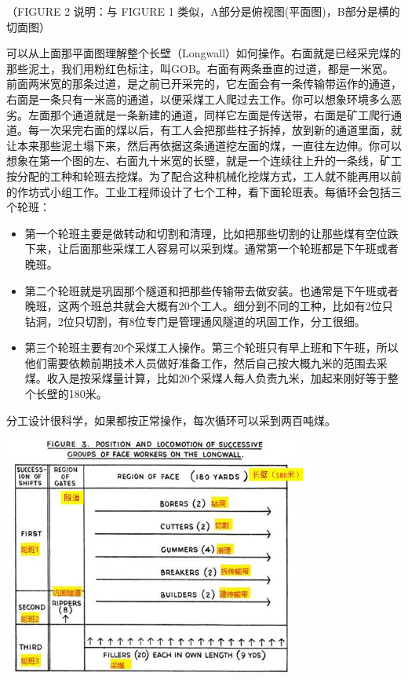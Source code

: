 （FIGURE 2 说明：与 FIGURE 1
类似，A部分是俯视图(平面图)，B部分是横的切面图）

可以从上面那平面图理解整个长壁（Longwall）如何操作。右面就是已经采完煤的那些泥土，我们用粉红色标注，叫GOB。右面有两条垂直的过道，都是一米宽。前面两米宽的那条过道，是之前已开采完的，它左面会有一条传输带运作的通道，右面是一条只有一米高的通道，以便采煤工人爬过去工作。你可以想象环境多么恶劣。左面那个通道就是一条新建的通道，同样它左面是传送带，右面是矿工爬行通道。每一次采完右面的煤以后，有工人会把那些柱子拆掉，放到新的通道里面，就让本来那些泥土塌下来，然后再依据这条通道挖左面的煤，一直往左边伸。你可以想象在第一个图的左、右面九十米宽的长壁，就是一个连续往上升的一条线，矿工按分配的工种和轮班去挖煤。为了配合这种机械化挖煤方式，工人就不能再用以前的作坊式小组工作。工业工程师设计了七个工种，看下面轮班表。每循环会包括三个轮班：

\begin{itemize}
\tightlist
\item
  第一个轮班主要是做转动和切割和清理，比如把那些切割的让那些煤有空位跌下来，让后面那些采煤工人容易可以采到煤。通常第一个轮班都是下午班或者晚班。
\item
  第二个轮班就是巩固那个隧道和把那些传输带去做安装。也通常是下午班或者晚班，这两个班总共就会大概有20个工人。细分到不同的工种，比如有2位只钻洞，2位只切割，有8位专门是管理通风隧道的巩固工作，分工很细。
\item
  第三个轮班主要有20个采煤工人操作。第三个轮班只有早上班和下午班，所以他们需要依赖前期技术人员做好准备工作，然后自己按大概九米的范围去采煤。收入是按采煤量计算，比如20个采煤人每人负责九米，加起来刚好等于整个长壁的180米。
\end{itemize}

分工设计很科学，如果都按正常操作，每次循环可以采到两百吨煤。


\includegraphics[width=10cm]{长壁1.jpg}

